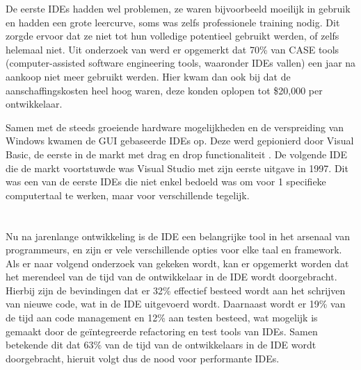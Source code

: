 De eerste IDEs hadden wel problemen, ze waren bijvoorbeeld moeilijk in gebruik en hadden een grote leercurve, soms was zelfs professionele training nodig. Dit zorgde ervoor dat ze niet tot hun volledige potentieel gebruikt werden, of zelfs helemaal niet. Uit onderzoek van \textcite{Kline2005} werd er opgemerkt dat 70\% van CASE tools (computer-assisted software engineering tools, waaronder IDEs vallen) een jaar na aankoop niet meer gebruikt werden. Hier kwam dan ook bij dat de aanschaffingskosten heel hoog waren, deze konden oplopen tot \$20,000 per ontwikkelaar.

Samen met de steeds groeiende hardware mogelijkheden en de verspreiding van Windows kwamen de GUI gebaseerde IDEs op. Deze werd gepionierd door Visual Basic, de eerste in de markt met drag en drop functionaliteit \autocite{Kiong2019}. De volgende IDE die de markt voortstuwde was Visual Studio met zijn eerste uitgave in 1997. Dit was een van de eerste IDEs die niet enkel bedoeld was om voor 1 specifieke computertaal te werken, maar voor verschillende tegelijk.

\section{}
\label{sec:IDE-nood}

Nu na jarenlange ontwikkeling is de IDE een belangrijke tool in het arsenaal van programmeurs, en zijn er vele verschillende opties voor elke taal en framework. Als er naar volgend onderzoek van \textcite{Tidelift2019} gekeken wordt, kan er opgemerkt worden dat het merendeel van de tijd van de ontwikkelaar in de IDE wordt doorgebracht. Hierbij zijn de bevindingen dat er 32\% effectief besteed wordt aan het schrijven van nieuwe code, wat in de IDE uitgevoerd wordt. Daarnaast wordt er 19\% van de tijd aan code management en 12\% aan testen besteed, wat mogelijk is gemaakt door de geïntegreerde refactoring en test tools van IDEs. Samen betekende dit dat 63\% van de tijd van de ontwikkelaars in de IDE wordt doorgebracht, hieruit volgt dus de nood voor performante IDEs.

\section{}
\label{sec:IDE-prominent}

